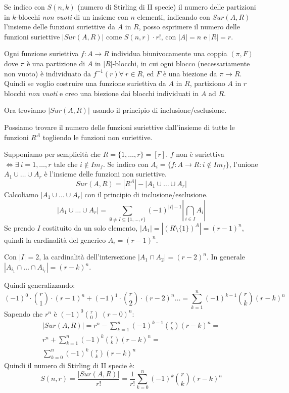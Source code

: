 
Se indico con $S(n, k)$ (numero di Stirling di II specie) il numero delle partizioni in $k$-blocchi \textit{non vuoti} di un insieme con $n$ elementi, indicando con $Sur(A, R)$ l'insieme delle funzioni suriettive da $A$ in $R$, posso esprimere il numero delle funzioni suriettive $|Sur(A,R)| $ come $S(n,r) \cdot r!$, con $|A| = n$ e $|R| = r$.

Ogni funzione suriettiva $f : A \to R $ individua biunivocamente una coppia $(\pi, F)$ dove $\pi$ \`e una partizione di $A$ in $|R|$-blocchi, in cui ogni blocco (necessariamente non vuoto) \`e individuato da $f^{-1}(r) \forall \ r \in R$, ed $F$ \`e una biezione da $\pi \to R$. Quindi se voglio costruire una funzione suriettiva da $A$ in $R$, partiziono $A$ in $r$ blocchi \textit{non vuoti} e creo una biezione dai blocchi individuati in $A$ ad $R$.

Ora troviamo $|Sur(A,R)|$ usando il principio di inclusione/esclusione.

Possiamo trovare il numero delle funzioni suriettive dall'insieme di tutte le funzioni $R^A$ togliendo le funzioni non suriettive.

Supponiamo per semplicit\`a che $R = \{ 1, \ldots , r\} = [r]$. $f$ non \`e suriettiva $\Leftrightarrow \exists \ i = 1, \ldots, r$ tale che $i \notin Im_f$. Se indico con $A_i = \{ f : A \to R : i \notin Im_f \}$, l'unione $A_1 \cup \ldots \cup A_r$ \`e l'insieme delle funzioni non suriettive.
\[
Sur(A,R) = |R^A| - |A_1 \cup \dots \cup A_r|
\]
Calcoliamo $|A_1 \cup \ldots \cup A_r|$ con il principio di inclusione/esclusione.
\[
| A_1 \cup \ldots \cup A_r |  = 
\sum_{\emptyset \neq I \subseteq \{ 1, \ldots, r \}} (-1)^{|I| - 1} \left| \bigcap_{i \in I} A_i \right|
\]
Se prendo $I$ costituito da un solo elemento, $|A_1| = \left| (R \setminus \{ 1 \})^A \right| = (r - 1)^n$, quindi la cardinalit\`a del generico $A_i = (r-1)^n$.

Con $|I| = 2$, la cardinalit\`a dell'intersezione $|A_1 \cap A_2| = (r - 2)^n$. In generale $|A_{i_1} \cap \dots \cap A_{i_r}| = (r - k)^n$.

Quindi generalizzando:
\[
(-1)^0 \cdot \binom{r}{1} \cdot (r-1)^n + 
(-1)^1 \cdot \binom{r}{2} \cdot (r-2)^n \dots =
\sum_{k = 1}^{n} (-1)^{k - 1} \binom{r}{k} (r - k)^n
\]
Sapendo che $r^n$ \`e $(-1)^0 \binom{r}{0} \ (r - 0)^n$:
\begin{align*}
|Sur(A,R)| = 
r^n - \sum_{k = 1}^{n} (-1)^{k - 1} \binom{r}{k} (r - k)^n =  \\
r^n + \sum_{k = 1}^{n} (-1)^{k} \binom{r}{k} (r - k)^n =  \\
\sum_{k = 0}^{n} (-1)^{k} \binom{r}{k} (r - k)^n
\end{align*}
Quindi il numero di Stirling di II specie \`e:
\begin{equation}
S(n,r) = \frac{|Sur(A,R)|}{r!} = \frac{1}{r!} \sum_{k = 0}^{n} (-1)^{k} \binom{r}{k} (r - k)^n
\end{equation}

